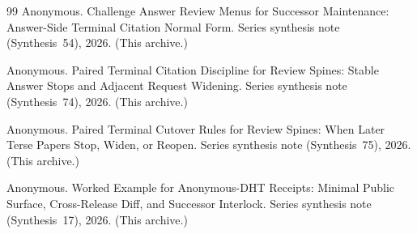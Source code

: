 \documentclass[11pt]{article}
\begin{document}
\begin{thebibliography}{99}
Anonymous.
\newblock Challenge Answer Review Menus for Successor Maintenance: Answer-Side Terminal Citation Normal Form.
\newblock Series synthesis note (Synthesis~54), 2026. (This archive.)

Anonymous.
\newblock Paired Terminal Citation Discipline for Review Spines: Stable Answer Stops and Adjacent Request Widening.
\newblock Series synthesis note (Synthesis~74), 2026. (This archive.)

Anonymous.
\newblock Paired Terminal Cutover Rules for Review Spines: When Later Terse Papers Stop, Widen, or Reopen.
\newblock Series synthesis note (Synthesis~75), 2026. (This archive.)

Anonymous.
\newblock Worked Example for Anonymous-DHT Receipts: Minimal Public Surface, Cross-Release Diff, and Successor Interlock.
\newblock Series synthesis note (Synthesis~17), 2026. (This archive.)

\end{thebibliography}
\end{document}
